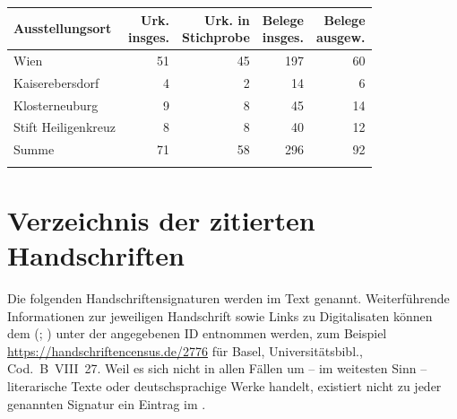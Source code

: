 \begin{tabularx}{\linewidth}{X r r r r}
\lsptoprule
Ausstellungsort
	& \makecell{Urk.\\ insges.}
	& \makecell{Urk. in\\ Stichprobe}
	& \makecell{Belege\\ insges.}
	& \makecell{Belege\\ ausgew.}
	\\
\midrule

Wien
	& 51
	& 45
	& 197
	& 60
	\\

Kaiserebersdorf
	& 4
	& 2
	& 14
	& 6
	\\

Klosterneuburg
	& 9
	& 8
	& 45
	& 14
	\\

Stift Heiligenkreuz
	& 8
	& 8
	& 40
	& 12
	\\

\midrule

Summe
	& 71
	& 58
	& 296
	& 92
	\\

\lspbottomrule
\end{tabularx}



\chapter{Verzeichnis der zitierten Handschriften}
\label{ch:hssverz}

Die folgenden Handschriftensignaturen werden im Text genannt. Weiterführende
Informationen zur jeweiligen Handschrift sowie Links zu
Digitalisaten können dem  (;
\nosh\cite{hsc}) unter der angegebenen ID entnommen werden, zum Beispiel
\url{https://handschriftencensus.de/2776} für Basel, Universitätsbibl.,
Cod.~B~VIII~27. Weil es sich nicht in allen Fällen um -- im weitesten Sinn --
literarische Texte oder deutsch\-sprachige Werke handelt, existiert nicht zu
jeder genannten Signatur ein Eintrag im .\\


